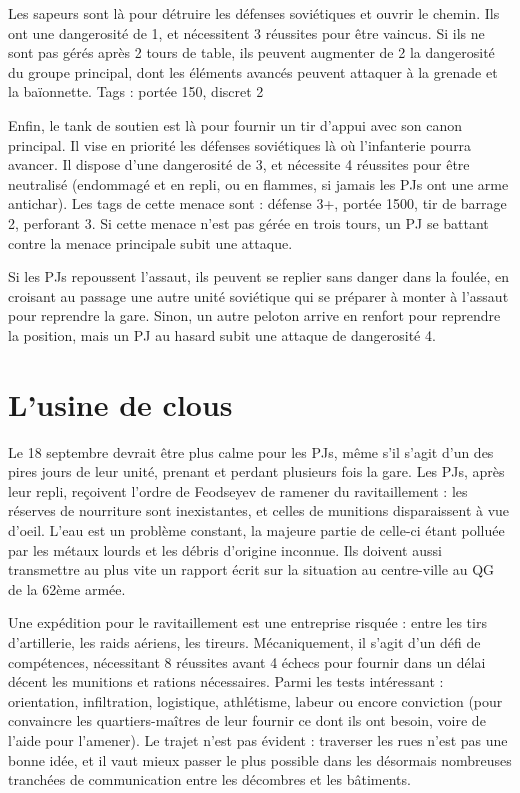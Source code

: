 \documentclass{report}
\begin{document}
\begin{multicols}{2}
Les sapeurs sont là pour détruire les défenses soviétiques et ouvrir le chemin. Ils ont une dangerosité de 1, et nécessitent 3 réussites pour être vaincus. Si ils ne sont pas gérés après 2 tours de table, ils peuvent augmenter de 2 la dangerosité du groupe principal, dont les éléments avancés peuvent attaquer à la grenade et la baïonnette. Tags : portée 150, discret 2

Enfin, le tank de soutien est là pour fournir un tir d'appui avec son canon principal. Il vise en priorité les défenses soviétiques là où l'infanterie pourra avancer. Il dispose d'une dangerosité de 3, et nécessite 4 réussites pour être neutralisé (endommagé et en repli, ou en flammes, si jamais les PJs ont une arme antichar). Les tags de cette menace sont : défense 3+, portée 1500, tir de barrage 2, perforant 3. Si cette menace n'est pas gérée en trois tours, un PJ se battant contre la menace principale subit une attaque. 

Si les PJs repoussent l'assaut, ils peuvent se replier sans danger dans la foulée, en croisant au passage une autre unité soviétique qui se préparer à monter à l'assaut pour reprendre la gare. Sinon, un autre peloton arrive en renfort pour reprendre la position, mais un PJ au hasard subit une attaque de dangerosité 4.
\section{L'usine de clous}
Le 18 septembre devrait être plus calme pour les PJs, même s'il s'agit d'un des pires jours de leur unité, prenant et perdant plusieurs fois la gare. Les PJs, après leur repli, reçoivent l'ordre de Feodseyev de ramener du ravitaillement : les réserves de nourriture sont inexistantes, et celles de munitions disparaissent à vue d'oeil. L'eau est un problème constant, la majeure partie de celle-ci étant polluée par les métaux lourds et les débris d'origine inconnue. Ils doivent aussi transmettre au plus vite un rapport écrit sur la situation au centre-ville au QG de la 62ème armée. 

Une expédition pour le ravitaillement est une entreprise risquée : entre les tirs d'artillerie, les raids aériens, les tireurs. Mécaniquement, il s'agit d'un défi de compétences, nécessitant 8 réussites avant 4 échecs pour fournir dans un délai décent les munitions et rations nécessaires. Parmi les tests intéressant : orientation, infiltration, logistique, athlétisme, labeur ou encore conviction (pour convaincre les quartiers-maîtres de leur fournir ce dont ils ont besoin, voire de l'aide pour l'amener). Le trajet n'est pas évident : traverser les rues n'est pas une bonne idée, et il vaut mieux passer le plus possible dans les désormais nombreuses tranchées de communication entre les décombres et les bâtiments.


\end{multicols}
\end{document}
